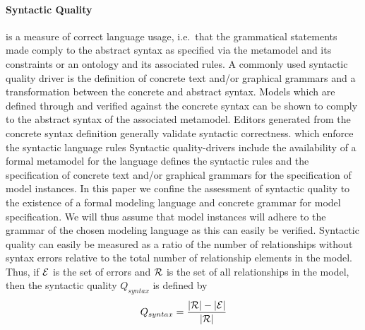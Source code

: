 \paragraph{Syntactic Quality} is a measure of correct language usage\cite{lange_christiaan_assessing_2007}, i.e.\ that the grammatical statements made comply to the abstract syntax as specified via the metamodel and its constraints or an ontology and its associated rules. A commonly used syntactic quality driver is the definition of concrete text and/or graphical grammars and a transformation between the concrete and abstract syntax\cite{}. Models which are defined through and verified against the concrete syntax can be shown to comply to the abstract syntax of the associated metamodel. Editors generated from the concrete syntax definition generally validate syntactic correctness\cite{}.
which enforce the syntactic language rules 
Syntactic quality-drivers include the availability of a formal metamodel for the language defines the syntactic rules and the specification of concrete text and/or graphical grammars  for the specification of model instances. In this paper we confine the assessment of syntactic quality to the existence of a formal modeling language and concrete grammar for model specification. We will thus assume that model instances will adhere to the grammar of the chosen modeling language as this can easily be verified. Syntactic quality can easily be measured as a ratio of the number of relationships without syntax errors relative to the total number of relationship elements in the model. Thus, if $\cal{E}$ is the set of errors and $\cal{R}$ is the set of all relationships in the model, then the syntactic quality $Q_{syntax}$ is defined by
\begin{equation}
  Q_{syntax} = \frac{|\cal{R}| - |\cal{E}|}{|\cal{R}|}
\end{equation}

